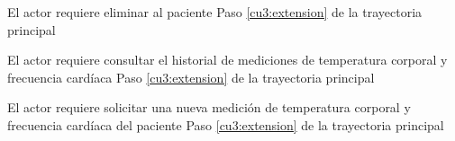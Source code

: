 \UCExtensionPoint
{El actor requiere eliminar al paciente}
{Paso \ref{cu3:extension} de la trayectoria principal}
{}

\UCExtensionPoint
{El actor requiere consultar el historial de mediciones de temperatura corporal y frecuencia cardíaca}
{Paso \ref{cu3:extension} de la trayectoria principal}
{}

\UCExtensionPoint
{El actor requiere solicitar una nueva medición de temperatura corporal y frecuencia cardíaca del paciente}
{Paso \ref{cu3:extension} de la trayectoria principal}
{}